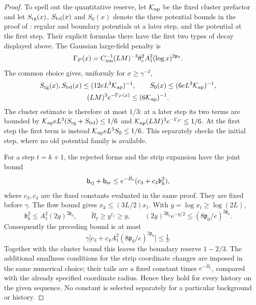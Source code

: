 \documentclass[11pt,letterpaper,reqno]{amsart}
\theoremstyle{definition}
\theoremstyle{remark}
\begin{document}
\begin{proof}
To spell out the quantitative reserve, let $\mathcal K_{\rm ap}$
be the fixed cluster prefactor and let $S_{\rm rg}(x)$,
$S_{\rm bd}(x)$ and $S_0(x)$ denote the three potential bounds
in the proof of \cite[Prop.~4.163]{YMM1}: regular and boundary
potentials at a later step, and the potential at the first step.
Their explicit formulas there have the first two types of decay
displayed above. The Gaussian large-field penalty is
\[
 \Gamma_P(x)=C_{\rm mn}^{-1}(LM)^{-3}
                \theta_c^2A_1^2(\log x)^{2\mathfrak p_0}.
\]
The common choice gives, uniformly for $x\ge\gamma^{-2}$,
\[
 \begin{gathered}
 S_{\rm rg}(x),S_{\rm bd}(x)
                   \le(12eL^3\mathcal K_{\rm ap})^{-1},\qquad
 S_0(x)\le(6eL^3\mathcal K_{\rm ap})^{-1},\\
 (LM)^3e^{-\Gamma_P(x)}\le(6\mathcal K_{\rm ap})^{-1}.
 \end{gathered}
\]
The cluster estimate is therefore at most $1/3$: at a later
step its two terms are bounded by
$\mathcal K_{\rm ap}eL^3(S_{\rm rg}+S_{\rm bd})\le1/6$
and $\mathcal K_{\rm ap}(LM)^3e^{-\Gamma_P}\le1/6$.
At the first step the first term is instead
$\mathcal K_{\rm ap}eL^3S_0\le1/6$. This separately checks
the initial step, where no old potential family is available.

For a step $t=k+1$, the rejected forms and the strip expansion
have the joint bound
\[
 \mathsf b_{\rm rj}+\mathsf b_{\rm sr}
 \le e^{-\check R_t}(c_3+c_4\mathfrak b_k^2),
\]
where $c_3,c_4$ are the fixed constants evaluated in the same
proof. They are fixed before $\gamma$. The flow bound gives
$x_k\le(3L/2)x_t$. With $y=\log x_t\ge\log(2L)$,
\[
 \mathfrak b_k^2\le A_1^2(2y)^{2\mathfrak p_0},\qquad
 \check R_t\ge y^{r_c}\ge y,\qquad
 (2y)^{2\mathfrak p_0}e^{-y/2}
                     \le(8\mathfrak p_0/e)^{2\mathfrak p_0}.
\]
Consequently the preceding bound is at most
\[
 \gamma\bigl[c_3+c_4A_1^2
                   (8\mathfrak p_0/e)^{2\mathfrak p_0}\bigr]
 \le\tfrac13.
\]
Together with the cluster bound this leaves the boundary
reserve $1-2/3$. The additional smallness conditions for the
strip coordinate changes are imposed in the same numerical
choice; their tails are a fixed constant times
$e^{-\check R_t}$, compared with the already specified
coordinate radius. Hence they hold for every history on the
given sequence. No constant is selected separately for a
particular background or history.


\end{proof}
\end{document}
